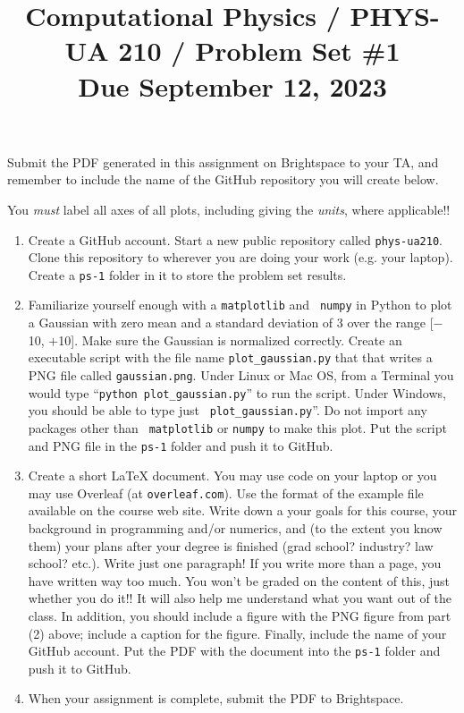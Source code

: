 \documentclass[11pt, preprint]{aastex}
\begin{document}
\title{\bf Computational Physics / PHYS-UA 210 / Problem Set \#1
\\ Due September 12, 2023 }

Submit the PDF generated in this assignment on Brightspace to your TA,
and remember to include the name of the GitHub repository you will
create below.

You {\it must} label all axes of all plots, including giving the {\it
  units}, where applicable!!

\begin{enumerate}

  \item Create a GitHub account. Start a new public repository called
    {\tt phys-ua210}. Clone this repository to wherever you are doing
    your work (e.g. your laptop). Create a {\tt ps-1} folder in it to
    store the problem set results.

  \item Familiarize yourself enough with a {\tt matplotlib} and {\tt
    numpy} in Python to plot a Gaussian with zero mean and a standard
    deviation of 3 over the range [$-$10, $+$10]. Make sure the
    Gaussian is normalized correctly. Create an executable script with
    the file name {\tt plot\_gaussian.py} that that writes a PNG file
    called {\tt gaussian.png}. Under Linux or Mac OS, from a Terminal
    you would type ``{\tt python plot\_gaussian.py}'' to run the
    script. Under Windows, you should be able to type just {\tt
      plot\_gaussian.py}''. Do not import any packages other than {\tt
      matplotlib} or {\tt numpy} to make this plot. Put the script and
    PNG file in the {\tt ps-1} folder and push it to GitHub.

  \item Create a short LaTeX document. You may use code on your laptop
    or you may use Overleaf (at {\tt overleaf.com}). Use the format of
    the example file available on the course web site. Write down a
    your goals for this course, your background in programming and/or
    numerics, and (to the extent you know them) your plans after your
    degree is finished (grad school? industry?  law school?
    etc.). Write just one paragraph! If you write more than a page,
    you have written way too much. You won't be graded on the content
    of this, just whether you do it!! It will also help me understand
    what you want out of the class. In addition, you should include a
    figure with the PNG figure from part (2) above; include a caption
    for the figure. Finally, include the name of your GitHub
    account. Put the PDF with the document into the {\tt ps-1} folder
    and push it to GitHub.

  \item When your assignment is complete, submit the PDF to
    Brightspace.

\end{enumerate}
\end{document}
